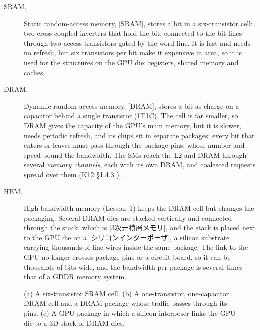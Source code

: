 \documentclass[../main.tex]{subfiles}
\begin{document}
\begin{description}
  \item[SRAM.]  Static random-access memory, [SRAM], stores a
    bit in a six-transistor cell: two cross-coupled inverters that hold
    the bit, connected to the bit lines through two access transistors
    gated by the word line.  It is fast and needs no refresh, but
    six transistors per bit make it expensive in area, so it is used
    for the structures on the GPU die: registers, shared memory and
    caches.
  \item[DRAM.]  Dynamic random-access memory, [DRAM], stores a
    bit as charge on a capacitor behind a single transistor (1T1C).
    The cell is far smaller, so DRAM gives the capacity of the GPU's
    main memory, but it is slower, needs periodic refresh, and its chips
    sit in separate packages: every bit that enters or leaves must pass
    through the package pins, whose number and speed bound the
    bandwidth.  The SMs reach the L2 and DRAM through several
    \emph{memory channels}, each with its own DRAM, and coalesced
    requests spread over them (K12 §1.4.3 \cite{kim2012gpgpu}).
  \item[HBM.]  High bandwidth memory (Lesson~1) keeps the DRAM cell but
    changes the packaging.  Several DRAM dies are stacked vertically and
    connected through the stack, which is
    [3次元積層メモリ], and the stack is placed
    next to the GPU die on a [シリコンインターポーザ],
    a silicon substrate carrying thousands of fine wires inside the same
    package.  The link to the GPU no longer crosses package pins or a
    circuit board, so it can be thousands of bits wide, and the bandwidth
    per package is several times that of a GDDR memory system.
\end{description}

\begin{figure}[htbp]
  \centering
  
  \caption{(a) A six-transistor SRAM cell.  (b) A one-transistor,
    one-capacitor DRAM cell and a DRAM package whose traffic passes
    through its pins.  (c) A GPU package in which a silicon interposer
    links the GPU die to a 3D stack of DRAM dies.}
  \label{fig:l04-sram-dram-hbm}
\end{figure}
\end{document}
